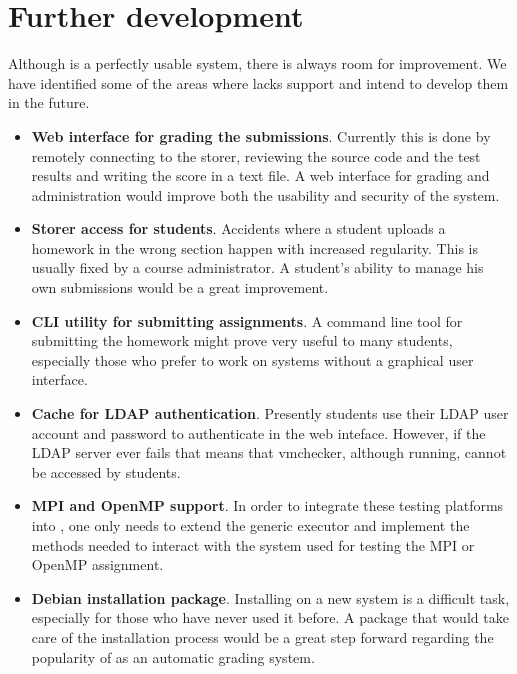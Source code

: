 \chapter{Further development}
\label{chapter:virt-devel}

Although \project is a perfectly usable system, there is always room for improvement.
We have identified some of the areas where \project lacks support and intend to
develop them in the future.

\begin{itemize}
\item {\bf Web interface for grading the submissions}. Currently this is done by
remotely connecting to the storer, reviewing the source code and the test results
and writing the score in a text file. A web interface for grading and administration
would improve both the usability and security of the system.
\item {\bf Storer access for students}. Accidents where a student uploads a
homework in the wrong section happen with increased regularity. This is usually
fixed by a course administrator. A student's ability to manage his own submissions
would be a great improvement.
\item {\bf CLI utility for submitting assignments}. A command line tool for 
submitting the homework might prove very useful to many students, especially
those who prefer to work on systems without a graphical user interface.
\item {\bf Cache for LDAP authentication}. Presently students use their
LDAP user account and password to authenticate in the web inteface. However,
if the LDAP server ever fails that means that vmchecker, although running,
cannot be accessed by students.
\item {\bf MPI and OpenMP support}. In order to integrate these testing platforms
into \project, one only needs to extend the generic executor and implement
the methods needed to interact with the system used for testing the MPI or OpenMP
assignment.
\item {\bf Debian installation package}. Installing \project on a new system
is a difficult task, especially for those who have never used it before. 
A package that would take care of the installation process would be a great 
step forward regarding the popularity of \project as an automatic grading system.
\end{itemize}
